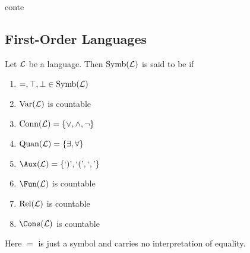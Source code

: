 \documentclass{book}
\begin{document}
	\begin{defn}
		conte
	\end{defn}
	
	
	
	
	
	
	
	
	
	
	
	
	
	
	
	
	
	
	
	
	
	
	
	
	
	
	
	
	
	
	
	
	
	
	
	
	
	
	
	
	
	
	
	
	
	
	
	
	
	\newpage
	\subsection{First-Order Languages}
	
	Let $\mathcal{L}$ be a language. Then $\operatorname{\text{Symb}}(\mathcal{L})$ is said to be  if 
	\begin{enumerate}
		\item ${=, \top, \perp} \in \operatorname{\text{Symb}}(\mathcal{L})$
		\item $\operatorname{\text{Var}}(\mathcal{L})$ is countable
		\item $\operatorname{\text{Conn}}(\mathcal{L}) = \{\vee, \wedge, \neg\}$
		\item $\operatorname{\text{Quan}}(\mathcal{L}) = \{\exists, \forall\}$
		\item $\Aux(\ML) = \{\text{`})\text{'}, \text{`}(\text{'}, \text{`},\text{'} \}$
		\item $\Fun(\ML)$ is countable
		\item $\text{Rel}(\mathcal{L})$ is countable
		\item $\Cons(\ML)$ is countable
	\end{enumerate}

	\begin{note}
		Here $=$ is just a symbol and carries no interpretation of equality.
	\end{note}
	
	
	
\end{document}
